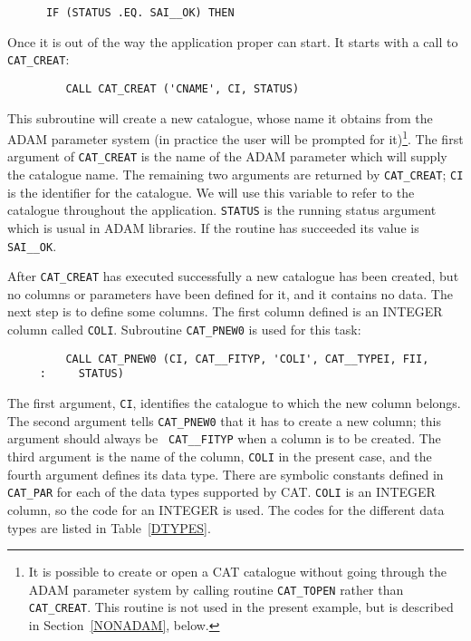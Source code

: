 \begin{verbatim}
      IF (STATUS .EQ. SAI__OK) THEN
\end{verbatim}

Once it is out of the way the application proper can start. It starts 
with a call to {\tt CAT\_CREAT}:

\begin{verbatim}
         CALL CAT_CREAT ('CNAME', CI, STATUS)
\end{verbatim}

This subroutine will create a new catalogue, whose name it obtains
from the ADAM parameter system (in practice the user will be prompted
for it)\footnote{It is possible to create or open a CAT catalogue
without going through the ADAM parameter system by calling routine
{\tt CAT\_TOPEN} rather than {\tt CAT\_CREAT}. This routine is not used
in the present example, but is described in Section~\ref{NONADAM}, 
below.}. The first argument of {\tt CAT\_CREAT} is the name of the ADAM
parameter which will supply the catalogue name. The remaining two
arguments are returned by {\tt CAT\_CREAT}; {\tt CI} is the identifier
for the catalogue. We will use this variable to refer to the catalogue
throughout the application. {\tt STATUS} is the running status argument
which is usual in ADAM libraries. If the routine has succeeded its value
is {\tt SAI\_\_OK}.

After {\tt CAT\_CREAT} has executed successfully a new catalogue has
been created, but no columns or parameters have been defined for it,
and it contains no data. The next step is to define some columns. The
first column defined is an INTEGER column called {\tt COLI}. Subroutine
{\tt CAT\_PNEW0} is used for this task:

\begin{verbatim}
         CALL CAT_PNEW0 (CI, CAT__FITYP, 'COLI', CAT__TYPEI, FII,
     :     STATUS)
\end{verbatim}

The first argument, {\tt CI}, identifies the catalogue to which the
new column belongs. The second argument tells {\tt CAT\_PNEW0} that it
has to create a new column; this argument should always be {\tt
CAT\_\_FITYP} when a column is to be created. The third argument is the
name of the column, {\tt COLI} in the present case, and the fourth 
argument defines its data type. There are symbolic constants defined in
{\tt CAT\_PAR} for each of the data types supported by CAT. {\tt COLI} 
is an INTEGER column, so the code for an INTEGER is used. The codes for 
the different data types are listed in Table~\ref{DTYPES}.

